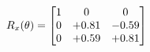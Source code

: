 \documentclass[preview]{standalone}
\begin{document}
\begin{align*}
\special{dvisvgm:raw <g id='unique000'>}R_{x}(\theta) = \begin{bmatrix}1 & 0 & 0 \\0 & +0.81 & -0.59 \\0 & +0.59 & +0.81\end{bmatrix}\special{dvisvgm:raw </g>}
\end{align*}
\end{document}
